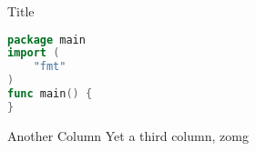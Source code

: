 \documentclass{minimal}
\begin{document}
Title
\begin{multicols}{3}

\begin{greybox}
\begin{lstlisting}[language=go]
package main
import (
	"fmt"
)
func main() {
}
\end{lstlisting}
\end{greybox}
\columnbreak
Another Column
\columnbreak
Yet a third column, zomg

\end{multicols}
\end{document}
